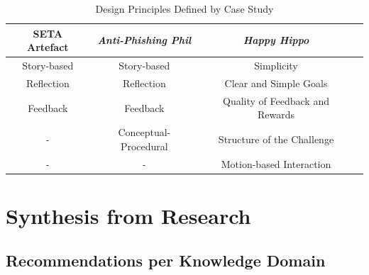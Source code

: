 \documentclass[conference]{IEEEtran}
\begin{document}
\begin{table}[h]
\caption{Design Principles Defined by Case Study \cite{Dincelli2020,Sheng2007,allers2021children}}
\begin{adjustwidth}{-0.5cm}{}
\begin{tabular}{|c|c|c|c|}
\hline

\textbf{SETA Artefact} & \textbf{\textit{Anti-Phishing Phil}}& \textbf{\textit{Happy Hippo}} \\
\hline
Story-based	& Story-based 			& Simplicity  \\
Reflection	& Reflection			& Clear and Simple Goals  \\
Feedback	& Feedback 				& Quality of Feedback and Rewards  \\
	-		& Conceptual-Procedural	& Structure of the Challenge  \\
	-		& 		-				& Motion-based Interaction  \\
\hline

\end{tabular}
\label{tab1}
\end{adjustwidth}
\end{table}





\section{Synthesis from Research}
\subsection{Recommendations per Knowledge Domain}
\end{document}
